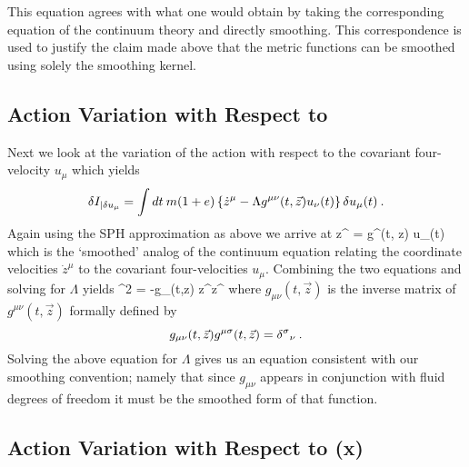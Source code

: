 This equation agrees with what one would obtain by taking the
corresponding equation of the continuum theory and directly
smoothing.  This correspondence is used to justify the claim made
above that the metric functions can be smoothed using solely the
smoothing kernel.

\subsection{Action Variation with Respect to \pvel{\gm}}
Next we look at the variation of the action with respect to the
covariant four-velocity $u_{\mu}$ which yields
\[
  \delta I_{\vert \delta u_{\mu}} =  \int dt \: m (1 + e) \left\{
  {\dot z}^{\mu} - \Lambda g^{\mu\nu}(t,\vec z) u_{\nu}(t)
  \right\} \delta u_{\mu}(t) \: .
\]
Again using the SPH approximation as above we arrive at
\be\label{eq:4vel_def} {\dot z}^{\mu} = \Lambda g^{\mu\nu}(t,\vec
z) u_{\nu}(t) \ee which is the `smoothed' analog of the continuum
equation relating the coordinate velocities ${\dot z}^{\mu}$ to
the covariant four-velocities $u_{\mu}$. Combining the two
equations and solving for $\Lambda$ yields \be\label{eq:Lambda}
 \Lambda^2 = -g_{\mu\nu}(t,\vec z) {\dot z}^{\mu}{\dot z}^{\nu}
\ee where $g_{\mu\nu}(t,\vec z)$ is the inverse matrix of
$g^{\mu\nu}(t,\vec z)$ formally defined by
\[
g_{\mu\nu}(t,\vec z) g^{\mu\sigma}(t,\vec z) =
{\delta^{\sigma}}_{\nu} \: .
\]
Solving the above equation for $\Lambda$ gives us an equation
consistent with our smoothing convention; namely that since
$g_{\mu\nu}$ appears in conjunction with fluid degrees of freedom
it must be the smoothed form of that function.

\subsection{Action Variation with Respect to \imet{\gm}{\gn}(x)}

